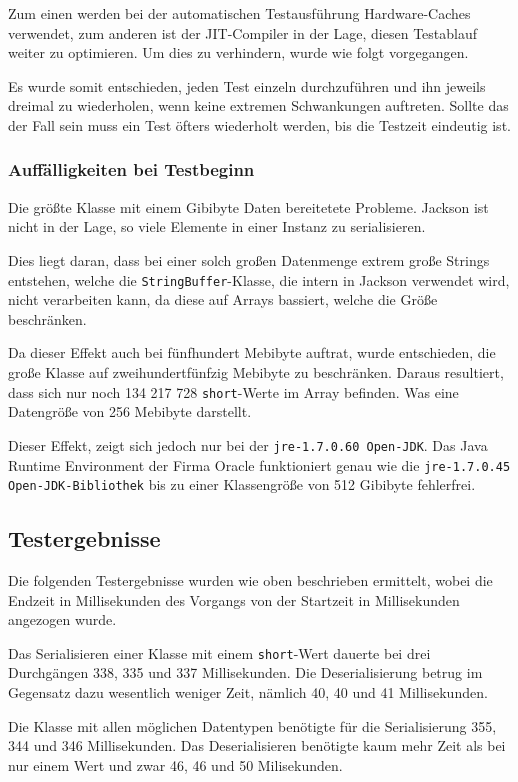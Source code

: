 Zum einen werden bei der automatischen Testausf\"uhrung Hardware-Caches verwendet, zum anderen ist der JIT-Compiler in der Lage, diesen Testablauf weiter zu optimieren. Um dies zu verhindern, wurde wie folgt vorgegangen.

Es wurde somit entschieden, jeden Test einzeln durchzuf\"uhren und ihn jeweils dreimal zu wiederholen, wenn keine extremen Schwankungen auftreten. Sollte das der Fall sein muss ein Test \"ofters wiederholt werden, bis die Testzeit eindeutig ist.

\subsubsection{Auff\"alligkeiten bei Testbeginn}
Die gr\"o\ss{}te Klasse mit einem Gibibyte Daten bereitetete Probleme. 
Jackson ist nicht in der Lage, so viele Elemente in einer Instanz zu serialisieren.

Dies liegt daran, dass bei einer solch gro\ss{}en Datenmenge extrem gro\ss{}e Strings entstehen, welche die \texttt{StringBuffer}-Klasse, die intern in Jackson verwendet wird, nicht verarbeiten kann, da diese auf Arrays bassiert, welche die Gr\"o\ss{}e beschr\"anken.

Da dieser Effekt auch bei f\"unfhundert Mebibyte auftrat, wurde entschieden, die gro\ss{}e Klasse auf zweihundertf\"unfzig Mebibyte zu beschr\"anken. Daraus resultiert, dass sich nur noch 134 217 728 \texttt{short}-Werte im Array befinden. Was eine Datengr\"o\ss{}e von 256 Mebibyte darstellt.

Dieser Effekt, zeigt sich jedoch nur bei der \texttt{jre-1.7.0.60 Open-JDK}. Das Java Runtime Environment der Firma Oracle funktioniert genau wie die \texttt{jre-1.7.0.45 Open-JDK-Bibliothek} bis zu einer Klassengr\"o\ss{}e von 512 Gibibyte fehlerfrei.

\subsection{Testergebnisse}
Die folgenden Testergebnisse wurden wie oben beschrieben ermittelt, wobei die Endzeit in Millisekunden des Vorgangs von der Startzeit in Millisekunden angezogen wurde.

Das Serialisieren einer Klasse mit einem \texttt{short}-Wert dauerte bei drei Durchg\"angen 338, 335 und 337 Millisekunden. Die Deserialisierung betrug im Gegensatz dazu wesentlich weniger Zeit, n\"amlich 40, 40 und 41 Millisekunden. 

Die Klasse mit allen m\"oglichen Datentypen ben\"otigte f\"ur die Serialisierung  355, 344 und 346 Millisekunden. Das Deserialisieren ben\"otigte kaum mehr Zeit als bei nur einem Wert und zwar 46, 46 und 50 Milisekunden.

